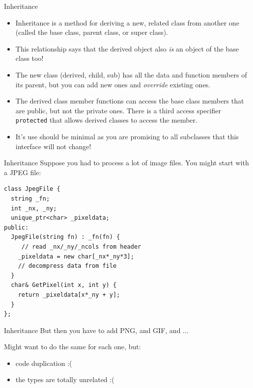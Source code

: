 \documentclass[presentation,t]{beamer}
\newcommand{\code}[1]{\lstinline!#1!}
\begin{document}
\begin{frame}{Inheritance}
  \begin{itemize}
  \item Inheritance is a method for deriving a new, related class from
    another one (called the base class, parent class, or super class).

  \item This relationship says that the derived object also \emph{is}
    an object of the base class too!
  
  \item The new class (derived, child, sub) has all the data and
    function members of its parent, but you can add new ones and
    \emph{override} existing ones.

  \item The derived class member functions can access the base class
    members that are public, but not the private ones. There is a
    third access specifier \code{protected} that allows derived
    classes to access the member.

  \item It's use should be minimal as you are promising to all
    subclasses that this interface will not change!
  \end{itemize}
\end{frame}

\begin{frame}[fragile]{Inheritance}
Suppose you had to process a lot of image files. You might start with
a JPEG file:
\begin{lstlisting}
class JpegFile {
  string _fn;
  int _nx, _ny;
  unique_ptr<char> _pixeldata;
public:
  JpegFile(string fn) : _fn(fn) {
     // read _nx/_ny/_ncols from header
    _pixeldata = new char[_nx*_ny*3];
    // decompress data from file
  }
  char& GetPixel(int x, int y) {
    return _pixeldata[x*_ny + y];
  }
};
\end{lstlisting}
\end{frame}

\begin{frame}{Inheritance}
  But then you have to add PNG, and GIF, and ...
  \pause
  
  Might want to do the same for each one, but:
  \begin{itemize}
  \item code duplication :(
  \item the types are totally unrelated :(
  \end{itemize}
\end{frame}
\end{document}
